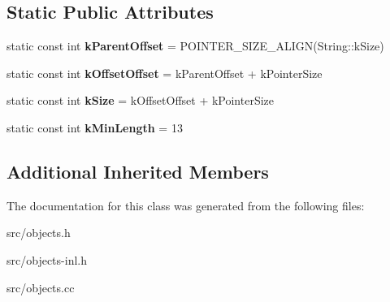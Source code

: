 \subsection*{Static Public Attributes}
\begin{DoxyCompactItemize}
\item 
\hypertarget{classv8_1_1internal_1_1_sliced_string_a2c749fb117a92c9051a49f1c1d77332b}{}static const int {\bfseries k\+Parent\+Offset} = P\+O\+I\+N\+T\+E\+R\+\_\+\+S\+I\+Z\+E\+\_\+\+A\+L\+I\+G\+N(String\+::k\+Size)\label{classv8_1_1internal_1_1_sliced_string_a2c749fb117a92c9051a49f1c1d77332b}

\item 
\hypertarget{classv8_1_1internal_1_1_sliced_string_a401ed356562a59051bd258ad7c3d4610}{}static const int {\bfseries k\+Offset\+Offset} = k\+Parent\+Offset + k\+Pointer\+Size\label{classv8_1_1internal_1_1_sliced_string_a401ed356562a59051bd258ad7c3d4610}

\item 
\hypertarget{classv8_1_1internal_1_1_sliced_string_aeb78cf184bcdf0b98b21a7440911fef9}{}static const int {\bfseries k\+Size} = k\+Offset\+Offset + k\+Pointer\+Size\label{classv8_1_1internal_1_1_sliced_string_aeb78cf184bcdf0b98b21a7440911fef9}

\item 
\hypertarget{classv8_1_1internal_1_1_sliced_string_a007f254a8f5d3daeb63aa3dbeba7d123}{}static const int {\bfseries k\+Min\+Length} = 13\label{classv8_1_1internal_1_1_sliced_string_a007f254a8f5d3daeb63aa3dbeba7d123}

\end{DoxyCompactItemize}
\subsection*{Additional Inherited Members}


The documentation for this class was generated from the following files\+:\begin{DoxyCompactItemize}
\item 
src/objects.\+h\item 
src/objects-\/inl.\+h\item 
src/objects.\+cc\end{DoxyCompactItemize}
